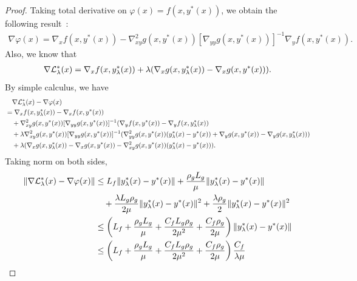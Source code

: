 \begin{proof}
Taking total derivative on $\varphi(x) = f(x,y^*(x))$, we obtain the following result~\cite{ghadimi2018approximation,ji2021bilevel}:
\begin{align} \label{eq:hyper-grad}
    \nabla \varphi(x) = \nabla_x f(x,y^*(x)) - \nabla_{xy}^2 g(x,y^*(x)) [ \nabla_{yy} g(x,y^*(x))]^{-1} \nabla_y f(x,y^*(x)). 
\end{align}
Also, we know that
\begin{align*}
    \nabla {\mathcal{L}}_{\lambda}^*(x) = \nabla_x f(x,y_{\lambda}^*(x)) + \lambda (\nabla_x g(x,y_{\lambda}^*(x)) - \nabla_x g(x,y^*(x))).
\end{align*}
By simple calculus, we have
\begin{align*}
    &\quad \nabla {\mathcal{L}}_{\lambda}^*(x) - \nabla \varphi(x) \\
    &= \nabla_x f(x,y_{\lambda}^*(x)) - \nabla_x f(x,y^*(x)) \\
    &\quad + \nabla_{xy}^2 g(x,y^*(x)) [ \nabla_{yy} g(x,y^*(x))]^{-1} (\nabla_y f(x,y^*(x)) - \nabla_y f(x,y_{\lambda}^*(x)) \\
    &\quad + \lambda \nabla_{xy}^2 g(x,y^*(x)) [ \nabla_{yy} g(x,y^*(x))]^{-1} ( \nabla_{yy}^2 g(x,y^*(x)) (y_{\lambda}^*(x) - y^*(x)) + \nabla_y g(x,y^*(x)) - \nabla_y g(x,y_{\lambda}^*(x)) ) \\
    &\quad + \lambda ( \nabla_x g(x,y_{\lambda}^*(x)) - \nabla_x  g(x,y^*(x)) - \nabla_{xy}^2 g(x,y^*(x)) (y_{\lambda}^*(x) - y^*(x)) ).
\end{align*}
Taking norm on both sides,
\begin{align*}
    \Vert \nabla {\mathcal{L}}_{\lambda}^*(x) - \nabla \varphi(x) \Vert &\le L_f \Vert y_{\lambda}^*(x) - y^*(x) \Vert + \frac{\rho_g L_g}{\mu} \Vert y_{\lambda}^*(x) - y^*(x) \Vert  \\
    &\quad + \frac{\lambda L_g \rho_g}{2\mu} \Vert y_{\lambda}^*(x) - y^*(x) \Vert^2  + \frac{\lambda \rho_g}{2} \Vert y_{\lambda}^*(x) - y^*(x) \Vert^2 \\
    &\le \left( L_f 
   + \frac{\rho_g L_g}{\mu} + \frac{C_f L_g \rho_g}{2\mu^2} + \frac{C_f \rho_g}{2\mu} 
    \right) \Vert y_{\lambda}^*(x) - y^*(x) \Vert \\
    &\le \left( L_f 
   + \frac{\rho_g L_g}{\mu} + \frac{C_f L_g \rho_g}{2\mu^2} + \frac{C_f \rho_g}{2\mu} 
    \right) \frac{C_f}{\lambda \mu}
\end{align*}


\end{proof}


